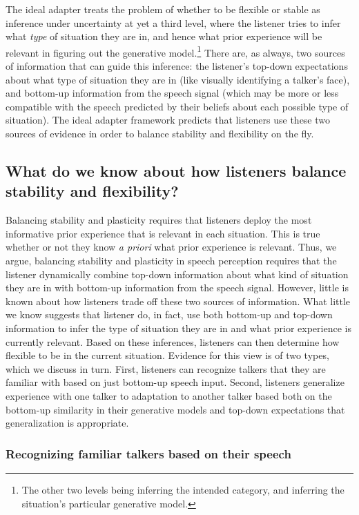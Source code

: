 The ideal adapter treats the problem of whether to be flexible or stable as inference under uncertainty at yet a third level, where the listener tries to infer what \emph{type} of situation they are in, and hence what prior experience will be relevant in figuring out the generative model.\footnote{The other two levels being inferring the intended category, and inferring the situation's particular generative model.}  There are, as always, two sources of information that can guide this inference: the listener's top-down expectations about what type of situation they are in (like visually identifying a talker's face), and bottom-up information from the speech signal (which may be more or less compatible with the speech predicted by their beliefs about each possible type of situation).  The ideal adapter framework predicts that listeners use these two sources of evidence in order to balance stability and flexibility on the fly.

\subsection{What do we know about how listeners balance stability and flexibility?}
\label{sec:what-do-we}

Balancing stability and plasticity requires that listeners deploy the most informative prior experience that is relevant in each situation.  This is true whether or not they know \emph{a priori} what prior experience is relevant.  Thus, we argue, balancing stability and plasticity in speech perception requires that the listener dynamically combine top-down information about what kind of situation they are in with bottom-up information from the speech signal.  However, little is known about how listeners trade off these two sources of information.  What little we know suggests that listener do, in fact, use both bottom-up and top-down information to infer the type of situation they are in and what prior experience is currently relevant. Based on these inferences, listeners can then determine how flexible to be in the current situation. Evidence for this view is of two types, which we discuss in turn.  First, listeners can recognize talkers that they are familiar with based on just bottom-up speech input.  Second, listeners generalize experience with one talker to adaptation to another talker based both on the bottom-up similarity in their generative models and top-down expectations that generalization is appropriate.  

\subsubsection{Recognizing familiar talkers based on their speech}
\label{sec:recogn-famil-talk-1}

